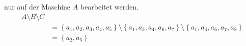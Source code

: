 nur auf der Maschine $A$ bearbeitet werden.
\begin{align}
	 A \setminus B \setminus C \\
	 	& =\left\{  a_1, a_2,a_3,a_4,a_5\right\} \setminus \left\{a_1,a_3,a_4,a_6, a_7\right\} \setminus \left\{ a_1, a_4, a_6, a_7, a_8 \right\}\\
	& = \left\{a_2,a_5\right\}
\end{align}